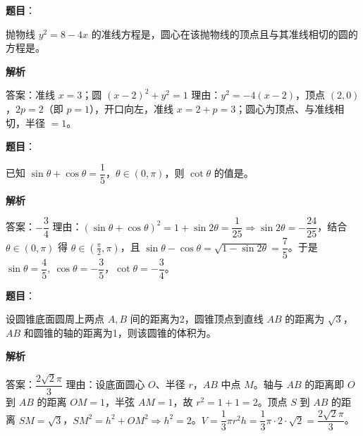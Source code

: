 \begin{answer}

\textbf{题目}：

抛物线 $y^2=8-4x$ 的准线方程是\underline{\qquad\qquad}，圆心在该抛物线的顶点且与其准线相切的圆的方程是\underline{\qquad\qquad}。

\textbf{解析}

答案：准线 $x=3$；圆 $(x-2)^2+y^2=1$
理由：$y^2=-4(x-2)$，顶点 $(2,0)$，$2p=2$（即 $p=1$），开口向左，准线 $x=2+p=3$；圆心为顶点、与准线相切，半径 $=1$。


\end{answer}
\begin{answer}

\textbf{题目}：

已知 $\sin\theta+\cos\theta=\dfrac15$，$\theta\in(0,\pi)$，则 $\cot\theta$ 的值是\underline{\qquad\qquad}。

\textbf{解析}

答案：$-\dfrac34$
理由：$(\sin\theta+\cos\theta)^2=1+\sin2\theta=\dfrac1{25}\Rightarrow\sin2\theta=-\dfrac{24}{25}$，结合 $\theta\in(0,\pi)$ 得 $\theta\in\left(\frac\pi2,\pi\right)$，且 $\sin\theta-\cos\theta=\sqrt{1-\sin2\theta}=\dfrac75$。于是 $\sin\theta=\dfrac45,\ \cos\theta=-\dfrac35$，$\cot\theta=-\dfrac34$。


\end{answer}
\begin{answer}

\textbf{题目}：

设圆锥底面圆周上两点 $A,B$ 间的距离为2，圆锥顶点到直线 $AB$ 的距离为 $\sqrt3$，$AB$ 和圆锥的轴的距离为1，则该圆锥的体积为\underline{\qquad\qquad}。

\textbf{解析}

答案：$\dfrac{2\sqrt2\pi}{3}$
理由：设底面圆心 $O$、半径 $r$，$AB$ 中点 $M$。轴与 $AB$ 的距离即 $O$ 到 $AB$ 的距离 $OM=1$，半弦 $AM=1$，故 $r^2=1+1=2$。顶点 $S$ 到 $AB$ 的距离 $SM=\sqrt3$，$SM^2=h^2+OM^2\Rightarrow h^2=2$。$V=\dfrac13\pi r^2h=\dfrac13\pi\cdot2\cdot\sqrt2=\dfrac{2\sqrt2\pi}{3}$。


\end{answer}
